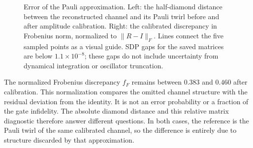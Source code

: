 \documentclass[a4paper,11pt]{article}
\begin{document}
\begin{figure}[htbp]
\centering
{}
\hfill
{}
\caption{Error of the Pauli approximation. Left: the half-diamond
distance between the reconstructed channel and its Pauli twirl before
and after amplitude calibration. Right: the calibrated discrepancy
in Frobenius norm, normalized to $\|R-I\|_F$. Lines connect the five
sampled points as a visual guide. SDP gaps for the saved matrices
are below $1.1\times10^{-8}$; these gaps do not include uncertainty
from dynamical integration or oscillator truncation.}
\label{fig:distance}
\end{figure}

The normalized Frobenius discrepancy $f_F$ remains between $0.383$
and $0.460$ after calibration. This normalization compares the omitted
channel structure with the residual deviation from the identity.
It is not an error probability or a fraction of the gate infidelity.
The absolute diamond distance and this relative matrix diagnostic
therefore answer different questions. In both cases, the reference
is the Pauli twirl of the same calibrated channel, so the difference
is entirely due to structure discarded by that approximation.
\end{document}
